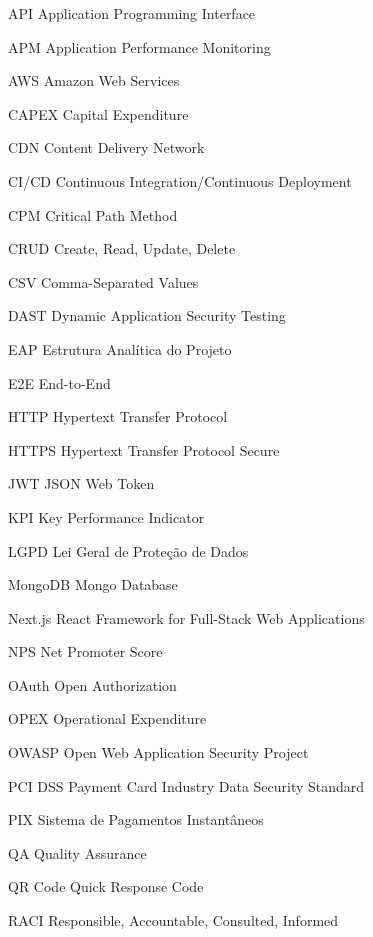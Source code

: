 

\begin{siglas}
    \item[API] Application Programming Interface
    \item[APM] Application Performance Monitoring
    \item[AWS] Amazon Web Services
    \item[CAPEX] Capital Expenditure
    \item[CDN] Content Delivery Network
    \item[CI/CD] Continuous Integration/Continuous Deployment
    \item[CPM] Critical Path Method
    \item[CRUD] Create, Read, Update, Delete
    \item[CSV] Comma-Separated Values
    \item[DAST] Dynamic Application Security Testing
    \item[EAP] Estrutura Analítica do Projeto
    \item[E2E] End-to-End
    \item[HTTP] Hypertext Transfer Protocol
    \item[HTTPS] Hypertext Transfer Protocol Secure
    \item[JWT] JSON Web Token
    \item[KPI] Key Performance Indicator
    \item[LGPD] Lei Geral de Proteção de Dados
    \item[MongoDB] Mongo Database
    \item[Next.js] React Framework for Full-Stack Web Applications
    \item[NPS] Net Promoter Score
    \item[OAuth] Open Authorization
    \item[OPEX] Operational Expenditure
    \item[OWASP] Open Web Application Security Project
    \item[PCI DSS] Payment Card Industry Data Security Standard
    \item[PIX] Sistema de Pagamentos Instantâneos
    \item[QA] Quality Assurance
    \item[QR Code] Quick Response Code
    \item[RACI] Responsible, Accountable, Consulted, Informed

\end{siglas}
